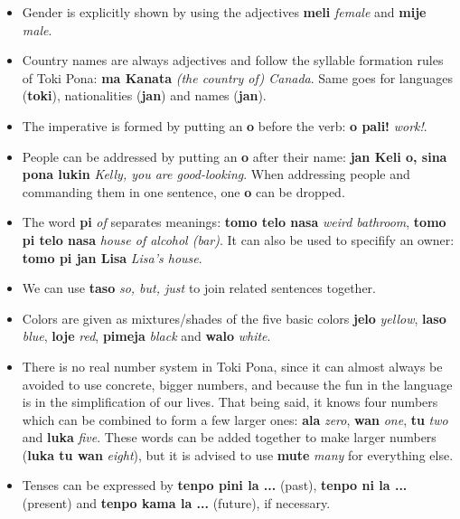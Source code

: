 \documentclass[10pt,a4paper]{article}
\begin{document}
\begin{itemize}
\item Gender is explicitly shown by using the adjectives \textbf{meli} \textit{female} and \textbf{mije} \textit{male}.
\item Country names are always adjectives and follow the syllable formation rules of Toki Pona: \textbf{ma Kanata} \textit{(the country of) Canada}. Same goes for languages (\textbf{toki}), nationalities (\textbf{jan}) and names (\textbf{jan}).
\item The imperative is formed by putting an \textbf{o} before the verb: \textbf{o pali!} \textit{work!}.
\item People can be addressed by putting an \textbf{o} after their name: \textbf{jan Keli o, sina pona lukin} \textit{Kelly, you are good-looking}. When addressing people and commanding them in one sentence, one \textbf{o} can be dropped.
\item The word \textbf{pi} \textit{of} separates meanings: \textbf{tomo telo nasa} \textit{weird bathroom}, \textbf{tomo pi telo nasa} \textit{house of alcohol (bar)}. It can also be used to specifify an owner: \textbf{tomo pi jan Lisa} \textit{Lisa's house}.
\item We can use \textbf{taso} \textit{so, but, just} to join related sentences together.
\item Colors are given as mixtures/shades of the five basic colors \textbf{jelo} \textit{yellow}, \textbf{laso} \textit{blue}, \textbf{loje} \textit{red}, \textbf{pimeja} \textit{black} and \textbf{walo} \textit{white}.
\item There is no real number system in Toki Pona, since it can almost always be avoided to use concrete, bigger numbers, and because the fun in the language is in the simplification of our lives. That being said, it knows four numbers which can be combined to form a few larger ones: \textbf{ala} \textit{zero}, \textbf{wan} \textit{one}, \textbf{tu} \textit{two} and \textbf{luka} \textit{five}. These words can be added together to make larger numbers (\textbf{luka tu wan} \textit{eight}), but it is advised to use \textbf{mute} \textit{many} for everything else.
\item Tenses can be expressed by \textbf{tenpo pini la ...} (past), \textbf{tenpo ni la ...} (present) and \textbf{tenpo kama la ...} (future), if necessary.\\
\end{itemize}
\end{document}
